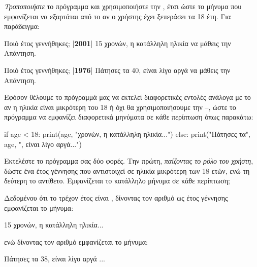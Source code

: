\documentclass[a4paper,11pt,oneside]{book}
\begin{document}
\begin{step}
\emph{Τροποποιήστε} το πρόγραμμα και χρησιμοποιήστε την , έτσι ώστε το μήνυμα που εμφανίζεται να εξαρτάται από το αν ο χρήστης έχει ξεπεράσει τα 18 έτη. Για παράδειγμα:

\marginnote[24pt]{\iconcomputer\hspace{1ex}\iconkeyboard}
\begin{pyterm}
Ποιό έτος γεννήθηκες;
|\textbf{2001}|
15 χρονών, η κατάλληλη ηλικία να μάθεις την Απάντηση.
\end{pyterm}

\begin{pyterm}
Ποιό έτος γεννήθηκες;
|\textbf{1976}|
Πάτησες τα 40, είναι λίγο αργά να μάθεις την Απάντηση.
\end{pyterm}

\begin{answer}
Εφόσον θέλουμε το πρόγραμμά μας να εκτελεί διαφορετικές εντολές ανάλογα με το αν η ηλικία είναι μικρότερη του 18 ή όχι θα χρησιμοποιήσουμε την --, ώστε το πρόγραμμα να εμφανίζει διαφορετικά μηνύματα σε κάθε περίπτωση όπως παρακάτω:

\begin{pynew}
if age < 18:
    print(age, "χρονών, η κατάλληλη ηλικία...")
else:
    print("Πάτησες τα", age, ", είναι λίγο αργά...")
\end{pynew}
\end{answer}

Εκτελέστε το πρόγραμμα σας δύο φορές. Την πρώτη, \emph{παίζοντας το ρόλο του χρήστη}, δώστε ένα έτος γέννησης που αντιστοιχεί σε ηλικία μικρότερη των 18 ετών, ενώ τη δεύτερη το αντίθετο. Εμφανίζεται το κατάλληλο μήνυμα σε κάθε περίπτωση;

\begin{answer}
Δεδομένου ότι το τρέχον έτος είναι , δίνοντας τον αριθμό  ως έτος γέννησης εμφανίζεται το μήνυμα:

\begin{pyterm}
15 χρονών, η κατάλληλη ηλικία...
\end{pyterm}


ενώ δίνοντας τον αριθμό  εμφανίζεται το μήνυμα: 

\begin{pyterm}
Πάτησες τα 38, είναι λίγο αργά ...
\end{pyterm}
\end{answer}
\end{step}
\end{document}
